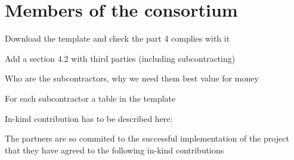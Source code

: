 \chapter{Members of the consortium}

{\color{red} Download the template and check the part 4 complies with it}

{\color{red} Add a section 4.2 with third parties (including subcontracting)

Who are the subcontractors, why we need them best value for money

For each subcontractor a table in the template

In-kind contribution has to be described here:

The partners are so commited to the successful implementation of the
project that they have agreed to the following in-kind contributions}

\label{sec:partners}
































